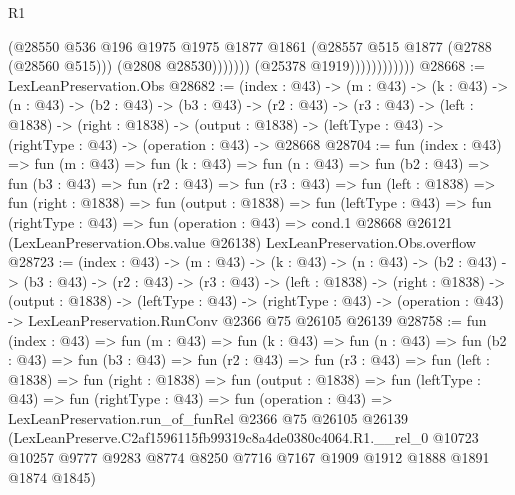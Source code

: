 \begin{lexlean}{R1}
\begin{coremodule}
                                    (@28550
                                      @536
                                      @196
                                      @1975
                                      @1975
                                      @1877
                                      @1861
                                      (@28557 @515 @1877 (@2788 (@28560 @515)))
                                      (@2808 @28530)))))))
                          (@25378 @1919))))))))))))
@28668 := LexLeanPreservation.Obs
@28682 := (index : @43) ->
  (m : @43) ->
  (k : @43) ->
  (n : @43) ->
  (b2 : @43) ->
  (b3 : @43) ->
  (r2 : @43) ->
  (r3 : @43) ->
  (left : @1838) ->
  (right : @1838) ->
  (output : @1838) -> (leftType : @43) -> (rightType : @43) -> (operation : @43) -> @28668
@28704 := fun (index : @43) =>
  fun (m : @43) =>
  fun (k : @43) =>
  fun (n : @43) =>
  fun (b2 : @43) =>
  fun (b3 : @43) =>
  fun (r2 : @43) =>
  fun (r3 : @43) =>
  fun (left : @1838) =>
  fun (right : @1838) =>
  fun (output : @1838) =>
  fun (leftType : @43) =>
  fun (rightType : @43) =>
  fun (operation : @43) =>
  cond.{1} @28668 @26121 (LexLeanPreservation.Obs.value @26138) LexLeanPreservation.Obs.overflow
@28723 := (index : @43) ->
  (m : @43) ->
  (k : @43) ->
  (n : @43) ->
  (b2 : @43) ->
  (b3 : @43) ->
  (r2 : @43) ->
  (r3 : @43) ->
  (left : @1838) ->
  (right : @1838) ->
  (output : @1838) ->
  (leftType : @43) ->
  (rightType : @43) -> (operation : @43) -> LexLeanPreservation.RunConv @2366 @75 @26105 @26139
@28758 := fun (index : @43) =>
  fun (m : @43) =>
  fun (k : @43) =>
  fun (n : @43) =>
  fun (b2 : @43) =>
  fun (b3 : @43) =>
  fun (r2 : @43) =>
  fun (r3 : @43) =>
  fun (left : @1838) =>
  fun (right : @1838) =>
  fun (output : @1838) =>
  fun (leftType : @43) =>
  fun (rightType : @43) =>
  fun (operation : @43) =>
  LexLeanPreservation.run_of_funRel
    @2366
    @75
    @26105
    @26139
    (LexLeanPreserve.C2af1596115fb99319c8a4de0380c4064.R1.__rel_0
      @10723
      @10257
      @9777
      @9283
      @8774
      @8250
      @7716
      @7167
      @1909
      @1912
      @1888
      @1891
      @1874
      @1845)
\end{coremodule}
\end{lexlean}
